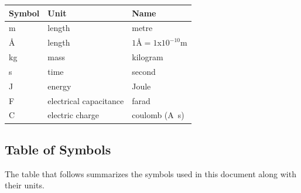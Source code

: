 \documentclass[12pt]{article}
\begin{document}
\renewcommand{\arraystretch}{1.2}
  \noindent \begin{tabular}{l l l} 
    \toprule		
    \textbf{Symbol} & \textbf{Unit} & \textbf{Name}\\
    \midrule 
    \si{\metre} & length & metre\\
    \si{\angstrom} & length & $1\si{\angstrom} = 1$x$10^{-10}$\si{\metre} \\
    \si{\kilogram} & mass	& kilogram\\
    \si{\second} & time & second\\
    \si{\joule} & energy & Joule\\
    \si{\farad} & electrical capacitance & farad \\
    \si{\coulomb} & electric charge & coulomb (\si{\ampere\second}) \\
    \bottomrule
  \end{tabular}



\subsection{Table of Symbols}\label{SRS-symbols}

The table that follows summarizes the symbols used in this document along with
their units.
\end{document}
